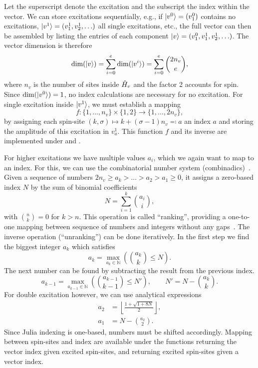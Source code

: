 Let the superscript denote the excitation and the subscript the index within
the vector.
We can store excitations sequentially,
e.g., if $\ket{v^0} = (v_1^0)$ contains no excitations,
$\ket{v^1} = (v_1^1, v_2^1, \ldots)$ all single excitations, etc.,
the full vector can then be assembled by listing the entries of each component
$\ket{v} = (v_1^0, v_1^1, v_2^1, \ldots)$.
The vector dimension is therefore
\begin{equation}
    \dim(\ket{v})
    = \sum_{i=0}^e \dim(\ket{v^i})
    = \sum_{i=0}^e \binom{2n_v}{e},
\end{equation}
where $n_v$ is the number of sites inside $\hat{H}_v$
and the factor 2 accounts for spin.
Since $\dim(\ket{v^0}) = 1$, no index calculations are necessary for
no excitation.
For single excitation inside $\ket{v^1}$,
we must establish a mapping
\begin{equation}
    f: \{1, \ldots, n_v\} \times \{1, 2\} \rightarrow \{1, \ldots, 2n_v\},
\end{equation}
by assigning each spin-site
$(k, \sigma)\mapsto k + (\sigma - 1) n_v \eqcolon a$ an index $a$
and storing the amplitude of this excitation in $v_a^1$.
This function $f$ and its inverse are implemented under
 and .

For higher excitations we have multiple values $a_i$,
which we again want to map to an index.
For this,
we can use the combinatorial number system
(combinadics)~\cite{Knuth2005}.
Given a sequence of numbers $2n_v \geq a_k > \ldots > a_2 > a_1 \geq 0$,
it assigns a zero-based index $N$
by the sum of binomial coefficients
\begin{equation}
    N = \sum_{i=1}^{k} \binom{a_i}{i},
\end{equation}
with $\binom{n}{k} = 0$ for $k > n$.
This operation is called ``ranking'',
providing a one-to-one mapping between sequence of numbers and integers
without any gaps~\cite{Liang1995}.
The inverse operation (``unranking'') can be done iteratively.
In the first step we find the biggest integer $a_k$ which satisfies
\begin{equation}
    \label{eq:unranking}
    a_k = \max_{a_k \in \mathbb{N}}\left(\binom{a_k}{k} \leq N\right).
\end{equation}
The next number can be found by subtracting the result from the previous index.
\begin{equation}
    a_{k-1} = \max_{a_{k-1} \in \mathbb{N}}
    \left(\binom{a_{k-1}}{k-1} \leq N'\right), \qquad N' = N - \binom{a_k}{k}.
\end{equation}
For double excitation however,
we can use analytical expressions
\begin{align}
    a_2 & = \left\lfloor \frac{1 + \sqrt{1 + 8N}}{2} \right\rfloor, \\
    a_1 & = N - \binom{a_2}{2}.
\end{align}
Since Julia indexing is one-based, numbers must be shifted accordingly.
Mapping between spin-sites and index are available under the functions
 returning the vector index given excited spin-sites,
and  returning excited spin-sites given a vector index.

